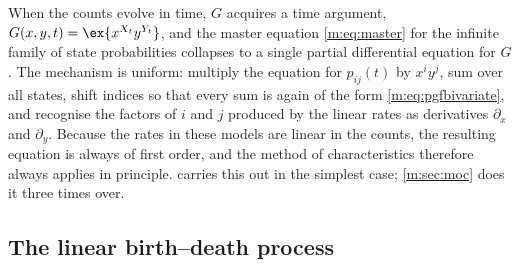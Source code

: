 When the counts evolve in time, $G$ acquires a time argument,
$G(x,y,t) = \ex{x^{X_t}y^{Y_t}}$, and the master equation \cref{m:eq:master} for the
infinite family of state probabilities collapses to a single partial differential
equation for $G$. The mechanism is uniform: multiply the equation for
$p_{ij}(t)$ by $x^iy^j$, sum over all states, shift indices so that every sum is
again of the form \cref{m:eq:pgfbivariate}, and recognise the factors of $i$ and $j$
produced by the linear rates as derivatives $\partial_x$ and $\partial_y$. Because
the rates in these models are linear in the counts, the resulting equation is
always of first order, and the method of characteristics therefore always applies
in principle.  carries this out in the simplest case;
\cref{m:sec:moc} does it three times over.

\subsection{The linear birth--death process}
\label{m:sec:linbd}

